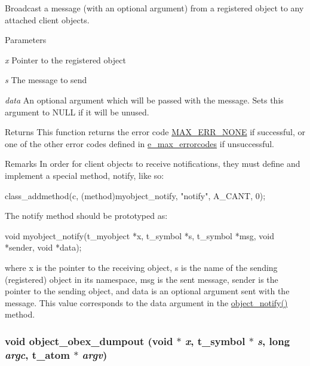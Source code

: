 Broadcast a message (with an optional argument) from a registered object to any attached client objects. 
\begin{DoxyParams}{Parameters}
\item[{\em x}]Pointer to the registered object \item[{\em s}]The message to send \item[{\em data}]An optional argument which will be passed with the message. Sets this argument to NULL if it will be unused.\end{DoxyParams}
\begin{DoxyReturn}{Returns}
This function returns the error code \hyperlink{group__misc_gga0764dd6c02b76cca7d053ae50555d69da6d22f77fef8b1e1b074cef5d29d935fd}{MAX\_\-ERR\_\-NONE} if successful, or one of the other error codes defined in \hyperlink{group__misc_ga0764dd6c02b76cca7d053ae50555d69d}{e\_\-max\_\-errorcodes} if unsuccessful.
\end{DoxyReturn}
\begin{DoxyRemark}{Remarks}
In order for client objects to receive notifications, they must define and implement a special method, {\ttfamily notify}, like so: 
\begin{DoxyCode}
    class_addmethod(c, (method)myobject_notify, "notify", A_CANT, 0);
\end{DoxyCode}


The {\ttfamily notify} method should be prototyped as: 
\begin{DoxyCode}
    void myobject_notify(t_myobject *x, t_symbol *s, t_symbol *msg, void *sender,
       void *data);
\end{DoxyCode}
 where {\ttfamily x} is the pointer to the receiving object, {\ttfamily s} is the name of the sending (registered) object in its namespace, {\ttfamily msg} is the sent message, {\ttfamily sender} is the pointer to the sending object, and {\ttfamily data} is an optional argument sent with the message. This value corresponds to the data argument in the \hyperlink{group__obj_ga6297b81c3a70f7fb2201c7262e96bba3}{object\_\-notify()} method. 
\end{DoxyRemark}
\hypertarget{group__obj_ga95edf6b869d6c5be94a59e49dddb0935}{
\subsubsection[{object\_\-obex\_\-dumpout}]{\setlength{\rightskip}{0pt plus 5cm}void object\_\-obex\_\-dumpout (void $\ast$ {\em x}, \/  {\bf t\_\-symbol} $\ast$ {\em s}, \/  long {\em argc}, \/  {\bf t\_\-atom} $\ast$ {\em argv})}}
\label{group__obj_ga95edf6b869d6c5be94a59e49dddb0935}


